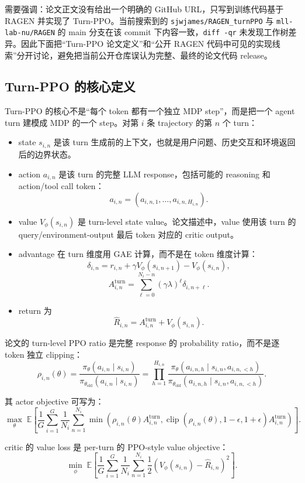 \documentclass[10pt]{ctexart}
\newcommand{\code}[1]{\texttt{#1}}
\begin{document}
需要强调：论文正文没有给出一个明确的 GitHub URL，只写到训练代码基于 RAGEN 并实现了 Turn-PPO。当前搜索到的 \code{sjwjames/RAGEN\_turnPPO} 与 \code{mll-lab-nu/RAGEN} 的 main 分支在该 commit 下内容一致，\code{diff -qr} 未发现工作树差异。因此下面把“Turn-PPO 论文定义”和“公开 RAGEN 代码中可见的实现线索”分开讨论，避免把当前公开仓库误认为完整、最终的论文代码 release。

\subsection*{Turn-PPO 的核心定义}
Turn-PPO 的核心不是“每个 token 都有一个独立 MDP step”，而是把一个 agent turn 建模成 MDP 的一个 step。对第 $i$ 条 trajectory 的第 $n$ 个 turn：
\begin{itemize}
  \item state $s_{i,n}$ 是该 turn 生成前的上下文，也就是用户问题、历史交互和环境返回后的边界状态。
  \item action $a_{i,n}$ 是该 turn 的完整 LLM response，包括可能的 reasoning 和 action/tool call token：
  \[
  a_{i,n}=(a_{i,n,1},\ldots,a_{i,n,H_{i,n}}).
  \]
  \item value $V_{\phi}(s_{i,n})$ 是 turn-level state value。论文描述中，value 使用该 turn 的 query/environment-output 最后 token 对应的 critic output。
  \item advantage 在 turn 维度用 GAE 计算，而不是在 token 维度计算：
  \[
  \delta_{i,n}=r_{i,n}+\gamma V_{\phi}(s_{i,n+1})-V_{\phi}(s_{i,n}),
  \]
  \[
  A^{\mathrm{turn}}_{i,n}
  =\sum_{\ell=0}^{N_i-n}(\gamma\lambda)^\ell\delta_{i,n+\ell}.
  \]
  \item return 为
  \[
  \hat R_{i,n}=A^{\mathrm{turn}}_{i,n}+V_{\phi}(s_{i,n}).
  \]
\end{itemize}

论文的 turn-level PPO ratio 是完整 response 的 probability ratio，而不是逐 token 独立 clipping：
\[
\rho_{i,n}(\theta)
=\frac{\pi_{\theta}(a_{i,n}\mid s_{i,n})}{\pi_{\theta_{\mathrm{old}}}(a_{i,n}\mid s_{i,n})}
=\prod_{h=1}^{H_{i,n}}
\frac{\pi_{\theta}(a_{i,n,h}\mid s_{i,n},a_{i,n,<h})}
{\pi_{\theta_{\mathrm{old}}}(a_{i,n,h}\mid s_{i,n},a_{i,n,<h})}.
\]

其 actor objective 可写为：
\[
\max_{\theta}\;
\mathbb{E}\left[
\frac{1}{G}\sum_{i=1}^{G}\frac{1}{N_i}\sum_{n=1}^{N_i}
\min\left(
\rho_{i,n}(\theta)A^{\mathrm{turn}}_{i,n},
\operatorname{clip}(\rho_{i,n}(\theta),1-\epsilon,1+\epsilon)A^{\mathrm{turn}}_{i,n}
\right)
\right].
\]

critic 的 value loss 是 per-turn 的 PPO-style value objective：
\[
\min_{\phi}\;
\mathbb{E}\left[
\frac{1}{G}\sum_{i=1}^{G}\frac{1}{N_i}\sum_{n=1}^{N_i}
\frac{1}{2}\left(V_{\phi}(s_{i,n})-\hat R_{i,n}\right)^2
\right].
\]
\end{document}
